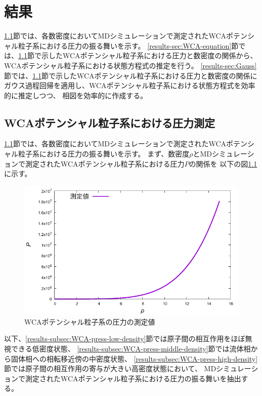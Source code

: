 \documentclass[titlepage]{jsreport}
\begin{document}
{{{\chapter{結果} \label{chap:results}
\ref{results-sec:WCA-press}節では、各数密度においてMDシミュレーションで測定されたWCAポテンシャル粒子系における圧力の振る舞いを示す。
\ref{results-sec:WCA-equation}節では、\ref{results-sec:WCA-press}節で示したWCAポテンシャル粒子系における圧力と数密度の関係から、WCAポテンシャル粒子系における状態方程式の推定を行う。
\ref{results-sec:Gauss}節では、\ref{results-sec:WCA-press}節で示したWCAポテンシャル粒子系における圧力と数密度の関係にガウス過程回帰を適用し、WCAポテンシャル粒子系における状態方程式を効率的に推定しつつ、
相図を効率的に作成する。

\section{WCAポテンシャル粒子系における圧力測定}\label{results-sec:WCA-press}
\ref{results-sec:WCA-press}節では、各数密度においてMDシミュレーションで測定されたWCAポテンシャル粒子系における圧力の振る舞いを示す。
まず、数密度$\rho$とMDシミュレーションで測定されたWCAポテンシャル粒子系における圧力$P$の関係を
以下の図\ref{fig:den-pre}に示す。

\begin{figure}[htbp]
    \begin{center}
        \includegraphics[width=14cm]{fig/den-pre.pdf}
    \end{center}
    \caption{WCAポテンシャル粒子系の圧力の測定値}
    \label{fig:den-pre}
\end{figure}

以下、\ref{results-subsec:WCA-press-low-density}節では原子間の相互作用をほぼ無視できる低密度状態、
\ref{results-subsec:WCA-press-middle-density}節では流体相から固体相への相転移近傍の中密度状態、
\ref{results-subsec:WCA-press-high-density}節では原子間の相互作用の寄与が大きい高密度状態において、
MDシミュレーションで測定されたWCAポテンシャル粒子系における圧力の振る舞いを抽出する。

}}}
\end{document}
